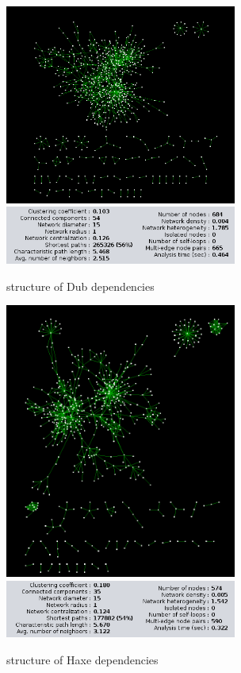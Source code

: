 \documentclass[letterpaper, 10 pt, conference]{ieeeconf}  %
\begin{document}
\begin{figure} %
\centering
\includegraphics[width=3in]{images/Dub_Graph.png}
\includegraphics[width=3in]{images/Dub_Params_Screenshot.png}
\caption{\label{Dub_Graph} structure of Dub dependencies}
\end{figure}

\begin{figure} %
\centering
\includegraphics[width=3in]{images/Haxelib_Graph.png}
\includegraphics[width=3in]{images/Haxelib_Params_Screenshot.png}
\caption{\label{Haxelib_Graph} structure of Haxe dependencies}
\end{figure}

\end{document}
